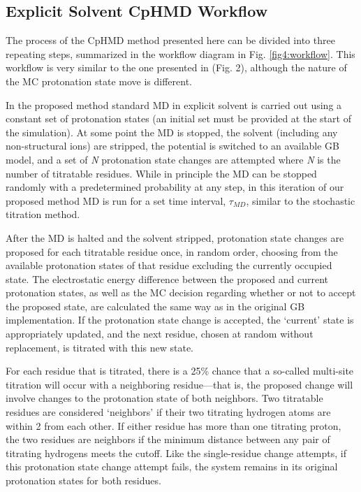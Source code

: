 \subsection{Explicit Solvent CpHMD Workflow}

The process of the CpHMD method presented here can be divided into three
repeating steps, summarized in the workflow diagram in Fig. \ref{fig4:workflow}.
This workflow is very similar to the one presented in
\citeauthor{Baptista_JChemPhys_2002_v117_p4184} (Fig. 2),
\cite{Baptista_JChemPhys_2002_v117_p4184} although the nature of the MC
protonation state move is different.

In the proposed method standard MD in explicit solvent is carried out using a
constant set of protonation states (an initial set must be provided at the start
of the simulation). At some point the MD is stopped, the solvent (including any
non-structural ions) are stripped, the potential is switched to an available GB
model, and a set of \emph{N} protonation state changes are attempted where
\emph{N} is the number of titratable residues. While in principle the MD can
be stopped randomly with a predetermined probability at any step, in this
iteration of our proposed method MD is run for a set time interval, $\tau_{MD}$,
similar to the stochastic titration method.
\cite{Baptista_JChemPhys_2002_v117_p4184}

After the MD is halted and the solvent stripped, protonation state changes are
proposed for each titratable residue once, in random order, choosing from the
available protonation states of that residue excluding the currently occupied
state. The electrostatic energy difference between the proposed and current
protonation states, as well as the MC decision regarding whether or not to
accept the proposed state, are calculated the same way as in the original GB
implementation. \cite{Mongan_JComputChem_2004_v25_p2038} If the protonation
state change is accepted, the `current' state is appropriately updated, and the
next residue, chosen at random without replacement, is titrated with this new
state.

For each residue that is titrated, there is a 25\% chance that a so-called
multi-site titration will occur with a neighboring residue---that is, the
proposed change will involve changes to the protonation state of both neighbors.
Two titratable residues are considered `neighbors' if their two titrating
hydrogen atoms are within 2 \text{\AA} from each other. If either residue has
more than one titrating proton, the two residues are neighbors if the minimum
distance between any pair of titrating hydrogens meets the cutoff. Like the
single-residue change attempts, if this protonation state change attempt fails,
the system remains in its original protonation states for both residues.

